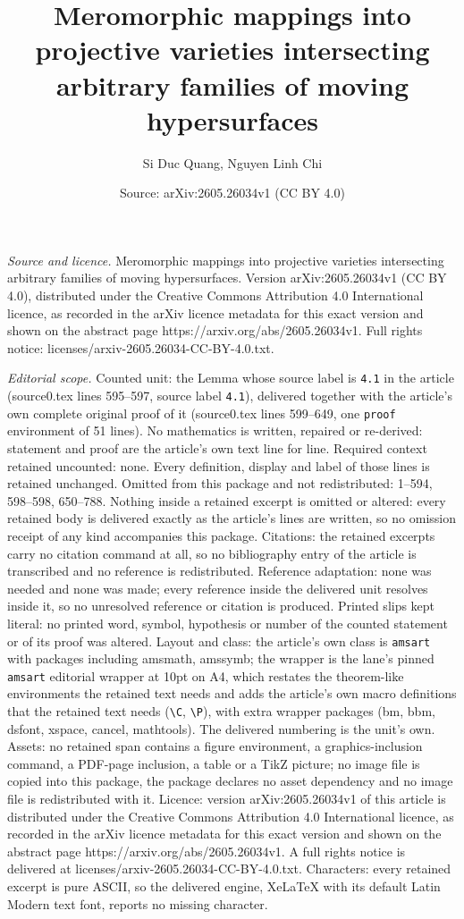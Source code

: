 \documentclass[10pt,a4paper]{amsart}
\title[Meromorphic mappings into projective varieties intersecting ]{Meromorphic mappings into projective varieties intersecting arbitrary families of moving hypersurfaces}
\author{Si Duc Quang, Nguyen Linh Chi}
\date{Source: arXiv:2605.26034v1 (CC BY 4.0)}
\begin{document}
\maketitle

\noindent\emph{Source and licence.} Meromorphic mappings into projective varieties intersecting arbitrary families of moving hypersurfaces. Version arXiv:2605.26034v1 (CC BY 4.0), distributed under the Creative Commons Attribution 4.0 International licence, as recorded in the arXiv licence metadata for this exact version and shown on the abstract page https://arxiv.org/abs/2605.26034v1. Full rights notice: licenses/arxiv-2605.26034-CC-BY-4.0.txt.\par\smallskip

\noindent\textit{Editorial scope.} Counted unit: the Lemma whose source label is \texttt{4.1} in the article (source0.tex lines 595--597, source label \texttt{4.1}), delivered together with the article's own complete original proof of it (source0.tex lines 599--649, one \texttt{proof} environment of 51 lines). No mathematics is written, repaired or re-derived: statement and proof are the article's own text line for line. Required context retained uncounted: none. Every definition, display and label of those lines is retained unchanged. Omitted from this package and not redistributed: 1--594, 598--598, 650--788. Nothing inside a retained excerpt is omitted or altered: every retained body is delivered exactly as the article's lines are written, so no omission receipt of any kind accompanies this package. Citations: the retained excerpts carry no citation command at all, so no bibliography entry of the article is transcribed and no reference is redistributed. Reference adaptation: none was needed and none was made; every reference inside the delivered unit resolves inside it, so no unresolved reference or citation is produced. Printed slips kept literal: no printed word, symbol, hypothesis or number of the counted statement or of its proof was altered. Layout and class: the article's own class is \texttt{amsart} with packages including amsmath, amssymb; the wrapper is the lane's pinned \texttt{amsart} editorial wrapper at 10pt on A4, which restates the theorem-like environments the retained text needs and adds the article's own macro definitions that the retained text needs (\texttt{\textbackslash C}, \texttt{\textbackslash P}), with extra wrapper packages (bm, bbm, dsfont, xspace, cancel, mathtools). The delivered numbering is the unit's own. Assets: no retained span contains a figure environment, a graphics-inclusion command, a PDF-page inclusion, a table or a TikZ picture; no image file is copied into this package, the package declares no asset dependency and no image file is redistributed with it. Licence: version arXiv:2605.26034v1 of this article is distributed under the Creative Commons Attribution 4.0 International licence, as recorded in the arXiv licence metadata for this exact version and shown on the abstract page https://arxiv.org/abs/2605.26034v1. A full rights notice is delivered at licenses/arxiv-2605.26034-CC-BY-4.0.txt. Characters: every retained excerpt is pure ASCII, so the delivered engine, XeLaTeX with its default Latin Modern text font, reports no missing character.
\end{document}
